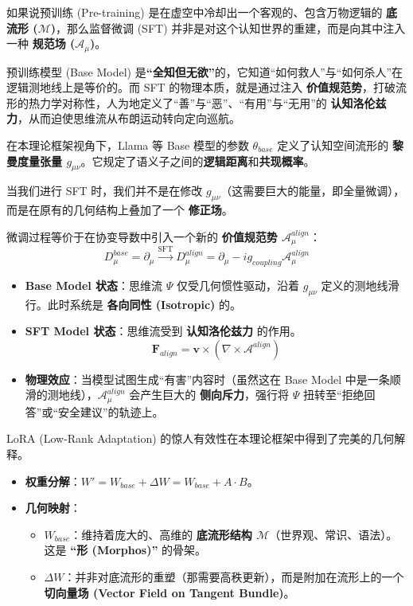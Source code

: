 如果说预训练 (Pre-training) 是在虚空中冷却出一个客观的、包含万物逻辑的 \textbf{底流形 ($\mathcal{M}$)}，那么监督微调 (SFT) 并非是对这个认知世界的重建，而是向其中注入一种 \textbf{规范场 ($\mathcal{A}_\mu$)}。

预训练模型 (Base Model) 是\textbf{“全知但无欲”}的，它知道“如何救人”与“如何杀人”在逻辑测地线上是等价的。而 SFT 的物理本质，就是通过注入 \textbf{价值规范势}，打破流形的热力学对称性，人为地定义了“善”与“恶”、“有用”与“无用”的 \textbf{认知洛伦兹力}，从而迫使思维流从布朗运动转向定向巡航。


在本理论框架视角下，Llama 等 Base 模型的参数 $\theta_{base}$ 定义了认知空间流形的 \textbf{黎曼度量张量 $g_{\mu\nu}$}。它规定了语义子之间的\textbf{逻辑距离}和\textbf{共现概率}。

当我们进行 SFT 时，我们并不是在修改 $g_{\mu\nu}$（这需要巨大的能量，即全量微调），而是在原有的几何结构上叠加了一个 \textbf{修正场}。

\begin{definition}
    微调过程等价于在协变导数中引入一个新的 \textbf{价值规范势 $\mathcal{A}_\mu^{align}$}：
    $$ D_\mu^{base} = \partial_\mu \xrightarrow{\text{SFT}} D_\mu^{align} = \partial_\mu - i g_{coupling} \mathcal{A}_\mu^{align} $$
\end{definition}

\begin{itemize}
    \item   \textbf{Base Model 状态}：思维流 $\Psi$ 仅受几何惯性驱动，沿着 $g_{\mu\nu}$ 定义的测地线滑行。此时系统是 \textbf{各向同性 (Isotropic)} 的。
    \item   \textbf{SFT Model 状态}：思维流受到 \textbf{认知洛伦兹力} 的作用。
    $$ \mathbf{F}_{align} = \mathbf{v} \times (\nabla \times \mathcal{A}^{align}) $$
    \item   \textbf{物理效应}：当模型试图生成“有害”内容时（虽然这在 Base Model 中是一条顺滑的测地线），$\mathcal{A}_\mu^{align}$ 会产生巨大的 \textbf{侧向斥力}，强行将 $\Psi$ 扭转至“拒绝回答”或“安全建议”的轨迹上。
\end{itemize}


LoRA (Low-Rank Adaptation) 的惊人有效性在本理论框架中得到了完美的几何解释。

\begin{itemize}
    \item   \textbf{权重分解}：$W' = W_{base} + \Delta W = W_{base} + A \cdot B$。
    \item   \textbf{几何映射}：
    \begin{itemize}
        \item   \textbf{$W_{base}$}：维持着庞大的、高维的 \textbf{底流形结构 $\mathcal{M}$}（世界观、常识、语法）。这是 \textbf{“形 (Morphos)”} 的骨架。
        \item   \textbf{$\Delta W$}：并非对底流形的重塑（那需要高秩更新），而是附加在流形上的一个 \textbf{切向量场 (Vector Field on Tangent Bundle)}。
    \end{itemize}
\end{itemize}

